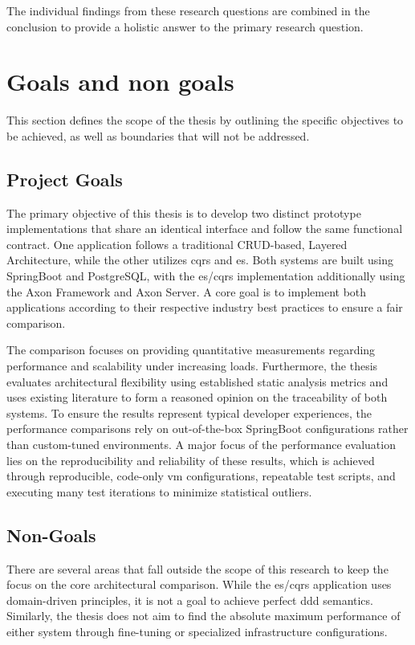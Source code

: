The individual findings from these research questions are combined in the conclusion to provide a holistic answer to the primary research question.

\section{Goals and non goals}
\label{sec:goals-and-non-goals}

This section defines the scope of the thesis by outlining the specific objectives to be achieved, as well as boundaries that will not be addressed.

\subsection{Project Goals}
\label{sec:goals}

The primary objective of this thesis is to develop two distinct prototype implementations that share an identical interface and follow the same functional contract. One application follows a traditional CRUD-based, Layered Architecture, while the other utilizes \gls{cqrs} and \gls{es}. Both systems are built using SpringBoot and PostgreSQL, with the \gls{es}/\gls{cqrs} implementation additionally using the Axon Framework and Axon Server. A core goal is to implement both applications according to their respective industry best practices to ensure a fair comparison.

The comparison focuses on providing quantitative measurements regarding performance and scalability under increasing loads. Furthermore, the thesis evaluates architectural flexibility using established static analysis metrics and uses existing literature to form a reasoned opinion on the traceability of both systems. To ensure the results represent typical developer experiences, the performance comparisons rely on out-of-the-box SpringBoot configurations rather than custom-tuned environments. A major focus of the performance evaluation lies on the reproducibility and reliability of these results, which is achieved through reproducible, code-only \gls{vm} configurations, repeatable test scripts, and executing many test iterations to minimize statistical outliers.

\subsection{Non-Goals}
\label{sec:non-goals}

There are several areas that fall outside the scope of this research to keep the focus on the core architectural comparison. While the \gls{es}/\gls{cqrs} application uses domain-driven principles, it is not a goal to achieve perfect \gls{ddd} semantics. Similarly, the thesis does not aim to find the absolute maximum performance of either system through fine-tuning or specialized infrastructure configurations.

